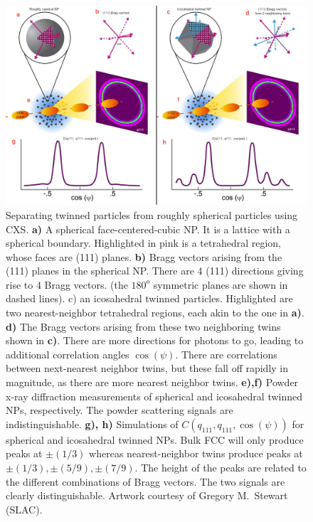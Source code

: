 \documentclass [11pt,fleqn]{article}
\begin{document}
\begin{figure}[h]
\begin{center}
\includegraphics[width=\textwidth,height=\textheight,keepaspectratio]{./8871A01_v04_update.png}
\end{center}
\caption{Separating twinned particles from roughly spherical particles using CXS. \textbf{a)} A spherical face-centered-cubic NP. It is a lattice with a spherical boundary. Highlighted in pink is a tetrahedral region, whose faces are (111) planes. \textbf{b)} Bragg vectors arising from the (111) planes in the spherical NP. There are 4 (111) directions giving rise to 4 Bragg vectors. (the $180^o$ symmetric planes are shown in dashed lines). c) an icosahedral twinned particles. Highlighted are two nearest-neighbor tetrahedral regions, each akin to the one in \textbf{a)}. \textbf{d)} The Bragg vectors arising from these two neighboring twins shown in \textbf{c)}. There are more directions for photons to go, leading to additional correlation angles $\cos(\psi)$. There are correlations between next-nearest neighbor twins, but these fall off rapidly in magnitude, as there are more nearest neighbor twins. \textbf{e),f)} Powder x-ray diffraction measurements of spherical and icosahedral twinned NPs, respectively. The powder scattering signals are indistinguishable.  \textbf{g), h)} Simulations of $C(q_{111},q_{111},\cos(\psi) )$ for spherical and icosahedral twinned NPs. Bulk FCC will only produce peaks at $\pm (1/3)$ whereas nearest-neighbor twins produce peaks at $\pm (1/3), \pm (5/9), \pm (7/9)$. The height of the peaks are related to the different combinations of Bragg vectors. The two signals are clearly distinguishable. Artwork courtesy of Gregory M.~Stewart (SLAC).}
\label{fig:contrast}
\end{figure}
\end{document}
